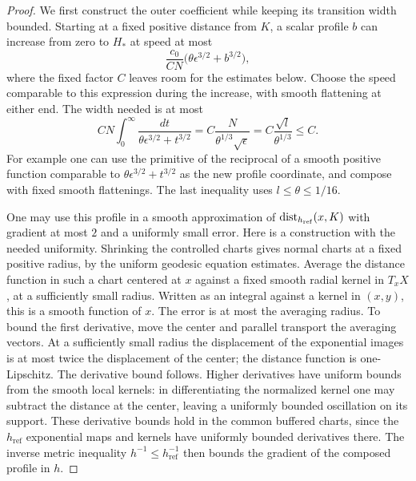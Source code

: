 \begin{proof}
We first construct the outer coefficient while keeping its
transition width bounded.  Starting at a fixed positive distance
from \(K\), a scalar profile \(b\) can increase from zero to
\(H_*\) at speed at most
\[
 \frac{c_0}{C N}\bigl(\theta\epsilon^{3/2}+b^{3/2}\bigr),
\]
where the fixed factor \(C\) leaves room for the estimates below.
Choose the speed comparable to this expression during the
increase, with smooth flattening at either end.  The width needed
is at most
\begin{equation}
 C N\int_0^\infty\frac{dt}
                  {\theta\epsilon^{3/2}+t^{3/2}}
 =C\frac{N}{\theta^{1/3}\sqrt\epsilon}
 =C\frac{\sqrt l}{\theta^{1/3}}\le C .
 \label{eq:graph-cutoff-width}
\end{equation}
For example one can use the primitive of the reciprocal of a smooth
positive function comparable to
\(\theta\epsilon^{3/2}+t^{3/2}\) as the new profile coordinate,
and compose with fixed smooth flattenings.  The last inequality
uses \(l\le\theta\le1/16\).

One may use this profile in a smooth approximation of
\(\operatorname{dist}_{h_{\mathrm{ref}}}(x,K)\) with gradient at most \(2\)
and a uniformly small error.  Here is a construction with the
needed uniformity.  Shrinking the controlled charts gives normal
charts at a fixed positive radius, by the uniform geodesic
equation estimates.  Average the distance function in such a
chart centered at \(x\) against a fixed smooth radial kernel in
\(T_xX\), at a sufficiently small radius.  Written as an integral
against a kernel in \((x,y)\), this is a smooth function of \(x\).
The error is at most the averaging radius.  To bound the first
derivative, move the center and parallel transport the averaging
vectors.  At a sufficiently small radius the displacement of
the exponential images is at most twice the displacement of the
center; the distance function is one-Lipschitz.  The derivative
bound follows.  Higher derivatives have uniform bounds from the
smooth local kernels: in differentiating the normalized kernel
one may subtract the distance at the center, leaving a uniformly
bounded oscillation on its support.  These derivative bounds hold in
the common buffered charts, since the \(h_{\mathrm{ref}}\) exponential
maps and kernels have uniformly bounded derivatives there.  The inverse metric
inequality \(h^{-1}\le h_{\mathrm{ref}}^{-1}\) then bounds the
gradient of the composed profile in \(h\).


\end{proof}
